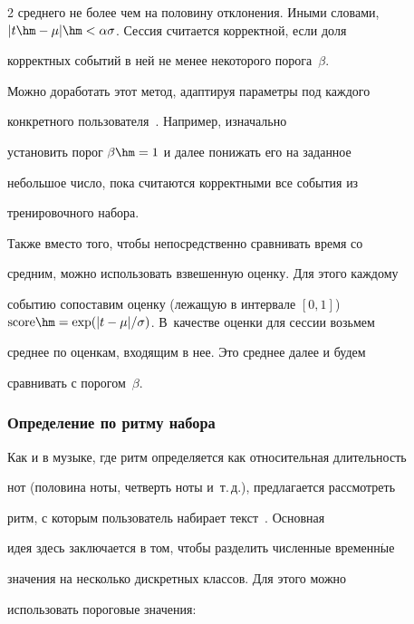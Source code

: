\begin{multicols}{2}
среднего не более чем на половину отклонения. Иными словами, $|t\hm-

\mu| \hm< \alpha  \sigma$. Сессия считается корректной, если доля

корректных событий в ней не менее некоторого порога~$\beta$.



Можно доработать этот метод, адаптируя параметры под каждого

конкретного пользователя~\cite{hocquet}. Например, изначально

установить порог $\beta \hm= 1$ и далее понижать его на заданное

небольшое число, пока считаются корректными все события из

тренировочного набора.



Также вместо того, чтобы непосредственно сравнивать время со

средним, можно использовать взвешенную оценку. Для этого каждому

событию сопоставим оценку (лежащую в интервале $[0,1]$)\linebreak $\mathrm{score} \hm=

\exp ({|t-\mu|/\sigma})$. В~качестве оценки для сессии возьмем

среднее по оценкам, входящим в нее. Это среднее далее и будем

сравнивать с порогом~$\beta$.



\vspace*{-4pt}



\subsubsection{Определение по ритму набора}



Как и в музыке, где ритм определяется как относительная длительность

нот (половина ноты, чет\-верть ноты и~т.\,д.), предлагается рассмотреть

ритм, с которым пользователь набирает текст~\cite{hocquet}. Основная

идея здесь заключается в том, чтобы разделить численные временн$\acute{\mbox{ы}}$е

значения на несколько дискретных классов. Для этого можно

использовать пороговые значения:


\end{multicols}
